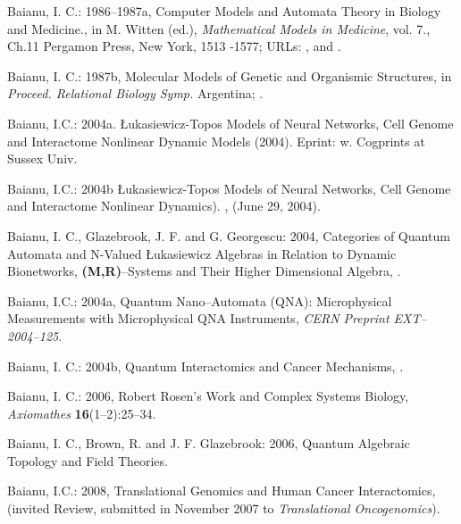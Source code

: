 \documentclass[12pt]{article}
\begin{document}
\begin{thebibliography}{399}
Baianu, I. C.: 1986--1987a, Computer Models and Automata Theory in Biology and Medicine.,  in M. Witten (ed.),
\emph{Mathematical Models in Medicine}, vol. 7., Ch.11 Pergamon Press, New York, 1513 -1577; URLs: 
 , 
and .

Baianu, I. C.: 1987b, Molecular Models of Genetic and Organismic Structures, in \emph{Proceed. Relational Biology Symp.}
Argentina; 
 .

Baianu, I.C.: 2004a. \L{}ukasiewicz-Topos Models of Neural Networks, Cell Genome and Interactome Nonlinear Dynamic Models (2004). Eprint: w. Cogprints at Sussex Univ. 

Baianu, I.C.: 2004b \L{}ukasiewicz-Topos Models of Neural Networks, Cell Genome and Interactome Nonlinear Dynamics). 
 , (June 29, 2004). 
 
Baianu, I. C., Glazebrook, J. F. and G. Georgescu: 2004, Categories of Quantum Automata and N-Valued \L ukasiewicz Algebras in Relation to Dynamic Bionetworks, \textbf{(M,R)}--Systems and Their Higher Dimensional Algebra, . 

Baianu, I.C.: 2004a, Quantum Nano--Automata (QNA): Microphysical Measurements with Microphysical QNA Instruments, 
\emph{CERN Preprint EXT--2004--125}.

Baianu, I. C.: 2004b, Quantum Interactomics and Cancer Mechanisms,
 .

Baianu, I. C.: 2006, Robert Rosen's Work and Complex Systems Biology, \emph{Axiomathes} \textbf{16}(1--2):25--34.


Baianu, I. C., Brown, R. and J. F. Glazebrook: 2006, Quantum Algebraic Topology and Field Theories. 


Baianu, I.C.: 2008, Translational Genomics and Human Cancer Interactomics, (invited Review, submitted in November 2007 to \emph{Translational Oncogenomics}).
 


\end{thebibliography}
\end{document}
